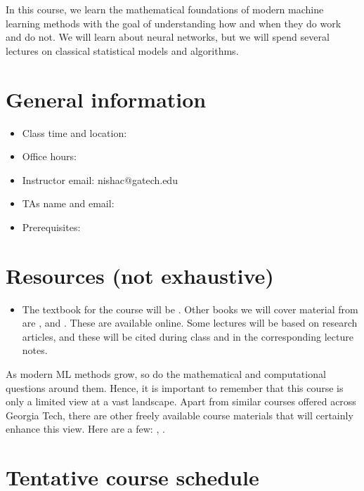 \documentclass[12pt]{article}
\begin{document}
	\MakeScribeTop

In this course, we learn the mathematical foundations of modern machine learning methods with the goal of understanding how and when they do work and do not. We will learn about neural networks, but we will spend several lectures on classical statistical models and algorithms.
\section{General information}
\begin{itemize}
	\item Class time and location:
	\item Office hours:
	\item Instructor email: nishac@gatech.edu
	\item TAs name and email: 
	\item Prerequisites: 
\end{itemize}
\section{Resources (not exhaustive)}

\begin{itemize}
	\item The textbook for the course will be \citep{shalev}. Other books we will cover material from are \citep{mohri}, \citep{murphy1} and \citep{murphy2}. These are available online. Some lectures will be based on research articles, and these will be cited during class and in the corresponding lecture notes. 
\end{itemize}
As modern ML methods grow, so do the mathematical and computational questions around them. Hence, it is important to remember that this course is only a limited view at a vast landscape. Apart from similar courses offered across Georgia Tech, there are other freely available course materials that will certainly enhance this view.
Here are a few: \citep{philippe}, \citep{stanford}.
\section{Tentative course schedule}
\end{document}
